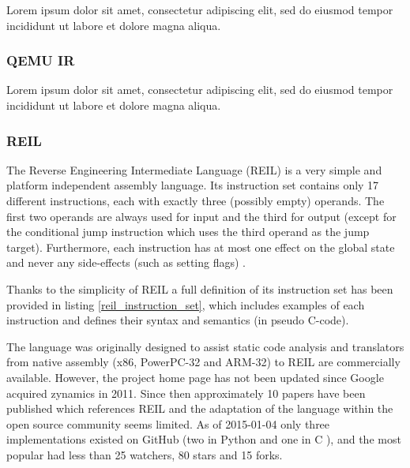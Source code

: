 \documentclass[12pt, a4paper]{article}
\begin{document}
Lorem ipsum dolor sit amet, consectetur adipiscing elit, sed do eiusmod tempor incididunt ut labore et dolore magna aliqua.


\subsubsection{QEMU IR}

Lorem ipsum dolor sit amet, consectetur adipiscing elit, sed do eiusmod tempor incididunt ut labore et dolore magna aliqua.


\subsubsection{REIL}

The Reverse Engineering Intermediate Language (REIL) is a very simple and platform independent assembly language. Its instruction set contains only 17 different instructions, each with exactly three (possibly empty) operands. The first two operands are always used for input and the third for output (except for the conditional jump instruction which uses the third operand as the jump target). Furthermore, each instruction has at most one effect on the global state and never any side-effects (such as setting flags) \cite{reil,reil_spec}.


Thanks to the simplicity of REIL a full definition of its instruction set has been provided in listing \ref{reil_instruction_set}, which includes examples of each instruction and defines their syntax and semantics (in pseudo C-code).





The language was originally designed to assist static code analysis and translators from native assembly (x86, PowerPC-32 and ARM-32) to REIL are commercially available. However, the project home page has not been updated since Google acquired zynamics in 2011. Since then approximately 10 papers have been published which references REIL and the adaptation of the language within the open source community seems limited. As of 2015-01-04 only three implementations existed on GitHub (two in Python \cite{barf,pyreil} and one in C \cite{bit}), and the most popular had less than 25 watchers, 80 stars and 15 forks.
\end{document}
